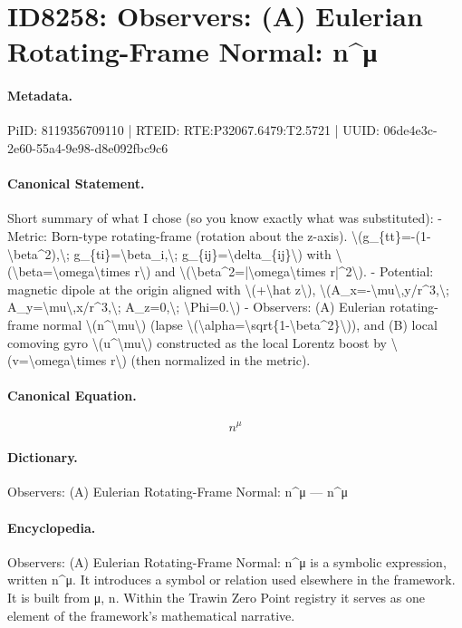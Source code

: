 \section*{ID8258: Observers: (A) Eulerian Rotating-Frame Normal: n\textasciicircum{}μ}
\paragraph{Metadata.}
PiID: 8119356709110 | RTEID: RTE:P32067.6479:T2.5721 | UUID: 06de4e3c-2e60-55a4-9e98-d8e092fbc9c6

\paragraph{Canonical Statement.}
Short summary of what I chose (so you know exactly what was substituted): - Metric: Born-type rotating-frame (rotation about the z-axis). \textbackslash{}(g\_\{tt\}=-(1-\textbackslash{}beta\textasciicircum{}2),\textbackslash{}; g\_\{ti\}=\textbackslash{}beta\_i,\textbackslash{}; g\_\{ij\}=\textbackslash{}delta\_\{ij\}\textbackslash{}) with \textbackslash{}(\textbackslash{}beta=\textbackslash{}omega\textbackslash{}times r\textbackslash{}) and \textbackslash{}(\textbackslash{}beta\textasciicircum{}2=|\textbackslash{}omega\textbackslash{}times r|\textasciicircum{}2\textbackslash{}). - Potential: magnetic dipole at the origin aligned with \textbackslash{}(+\textbackslash{}hat z\textbackslash{}), \textbackslash{}(A\_x=-\textbackslash{}mu\textbackslash{},y/r\textasciicircum{}3,\textbackslash{}; A\_y=\textbackslash{}mu\textbackslash{},x/r\textasciicircum{}3,\textbackslash{}; A\_z=0,\textbackslash{}; \textbackslash{}Phi=0.\textbackslash{}) - Observers: (A) Eulerian rotating-frame normal \textbackslash{}(n\textasciicircum{}\textbackslash{}mu\textbackslash{}) (lapse \textbackslash{}(\textbackslash{}alpha=\textbackslash{}sqrt\{1-\textbackslash{}beta\textasciicircum{}2\}\textbackslash{})), and (B) local comoving gyro \textbackslash{}(u\textasciicircum{}\textbackslash{}mu\textbackslash{}) constructed as the local Lorentz boost by \textbackslash{}(v=\textbackslash{}omega\textbackslash{}times r\textbackslash{}) (then normalized in the metric).

\paragraph{Canonical Equation.}
\[
n^\mu
\]

\paragraph{Dictionary.}
Observers: (A) Eulerian Rotating-Frame Normal: n\textasciicircum{}μ — n\textasciicircum{}μ

\paragraph{Encyclopedia.}
Observers: (A) Eulerian Rotating-Frame Normal: n\textasciicircum{}μ is a symbolic expression, written n\textasciicircum{}μ. It introduces a symbol or relation used elsewhere in the framework. It is built from μ, n. Within the Trawin Zero Point registry it serves as one element of the framework's mathematical narrative.

